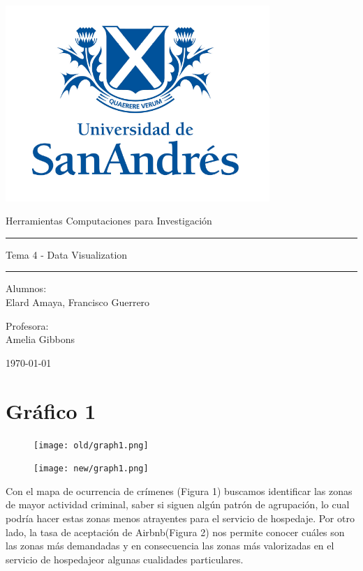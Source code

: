 \documentclass[11pt,a4paper]{article}
\begin{document}
\thispagestyle{empty}
\begin{center}
\includegraphics[width=10cm]{logo udesa.PNG}
\end{center}


	\begin{center}
	\LARGE
	Herramientas Computaciones para Investigación
\\			\vspace{1cm}
\hrule
	\vspace{0.5cm}
	\LARGE
 Tema 4 - Data Visualization
\\		
		\vspace{0.5cm}
		\hrule
				\vspace{1cm}
	\large

	\vspace{2.5cm}
	\large
		Alumnos:\\
	\large
	Elard Amaya, Francisco Guerrero
	
	
	\vspace{1.3cm}
	\normalsize	
	Profesora:\\

	\normalsize
	Amelia Gibbons
	
	\vspace{1.3cm}
	\today
	\end{center}

\clearpage
\section{Gráfico 1}

\begin{figure}[!h]
    \centering
    \texttt{[image: old/graph1.png]}
\end{figure}

\begin{figure}[!h]
    \centering
    \texttt{[image: new/graph1.png]}
\end{figure}
Con el mapa de ocurrencia de crímenes (Figura 1) buscamos identificar las zonas de mayor actividad criminal, saber si siguen algún patrón de agrupación, lo cual podría hacer estas zonas menos atrayentes para el servicio de hospedaje. Por otro lado, la tasa de aceptación de Airbnb(Figura 2) nos permite conocer cuáles son las zonas más demandadas y en consecuencia las zonas más valorizadas en el servicio de hospedajeor algunas cualidades particulares. 
\end{document}
